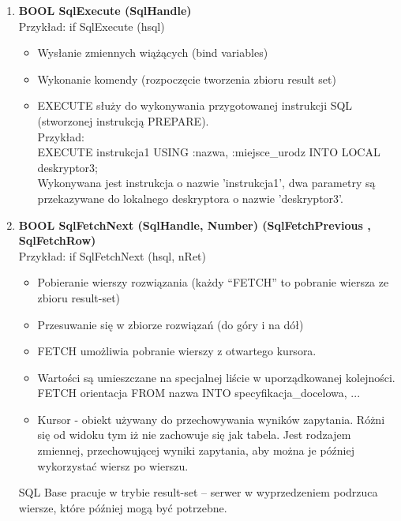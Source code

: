 \documentclass[a4paper,twoside]{article}
\begin{document}
\begin{enumerate}
  		\item \textbf{BOOL SqlExecute (SqlHandle)}\\
  		Przykład:
  		if SqlExecute (hsql)
  		\begin{itemize}
  			\item Wysłanie zmiennych wiążących (bind variables)
  			\item Wykonanie komendy (rozpoczęcie tworzenia zbioru result set)
  			\item EXECUTE służy do wykonywania przygotowanej instrukcji SQL (stworzonej instrukcją PREPARE).\\
  			Przykład:\\
  			EXECUTE instrukcja1 USING :nazwa, :miejsce\_urodz INTO LOCAL deskryptor3;\\
  			Wykonywana jest instrukcja o nazwie 'instrukcja1', dwa parametry są przekazywane do lokalnego deskryptora o nazwie 'deskryptor3'.
  		\end{itemize}
  		
  		\item \textbf{BOOL SqlFetchNext (SqlHandle, Number) (SqlFetchPrevious , SqlFetchRow)}\\
  		Przykład:
  		if SqlFetchNext (hsql, nRet)
  		\begin{itemize}
  			\item Pobieranie wierszy rozwiązania (każdy “FETCH” to pobranie wiersza ze zbioru result-set)
  			\item Przesuwanie się w zbiorze rozwiązań (do góry i na dół)
  			\item FETCH umożliwia pobranie wierszy z otwartego kursora.
  			\item Wartości są umieszczane na specjalnej liście w uporządkowanej kolejności.\\
  			FETCH orientacja FROM nazwa INTO specyfikacja\_docelowa, ...
  			\item Kursor - obiekt używany do przechowywania wyników zapytania. Różni się od widoku tym iż nie zachowuje się jak tabela. Jest rodzajem zmiennej, przechowującej wyniki zapytania, aby można je później wykorzystać wiersz po wierszu.
  		\end{itemize}
  		SQL Base pracuje w trybie result-set – serwer w wyprzedzeniem podrzuca wiersze, które później mogą być potrzebne.\\
  		

\end{enumerate}
\end{document}
